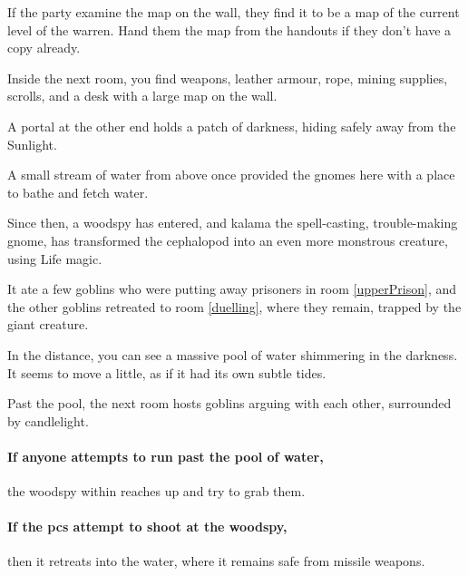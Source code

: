 \begin{multicols}{2}
If the party examine the map on the wall, they find it to be a map of the current level of the warren.
Hand them the map from the handouts if they don't have a copy already.

\begin{boxtext}
  Inside the next room, you find weapons, leather armour, rope, mining supplies, scrolls, and a desk with a large map on the wall.

  A portal at the other end holds a patch of darkness, hiding safely away from the Sunlight.
\end{boxtext}


\begin{exampletext}

  A small stream of water from above once provided the gnomes here with a place to bathe and fetch water.

  Since then, a woodspy has entered, and \gls{kalama} the spell-casting, trouble-making gnome, has transformed the cephalopod into an even more monstrous creature, using Life magic.

  It ate a few goblins who were putting away prisoners in room \ref{upperPrison}, and the other goblins retreated to room \ref{duelling}, where they remain, trapped by the giant creature.

\end{exampletext}

\begin{boxtext}
  In the distance, you can see a massive pool of water shimmering in the darkness.
  It seems to move a little, as if it had its own subtle tides.

  Past the pool, the next room hosts goblins arguing with each other, surrounded by candlelight.
\end{boxtext}


\paragraph{If anyone attempts to run past the pool of water,}
the woodspy within reaches up and try to grab them.

\paragraph{If the \glspl{pc} attempt to shoot at the woodspy,}
then it retreats into the water, where it remains safe from missile weapons.


\end{multicols}
